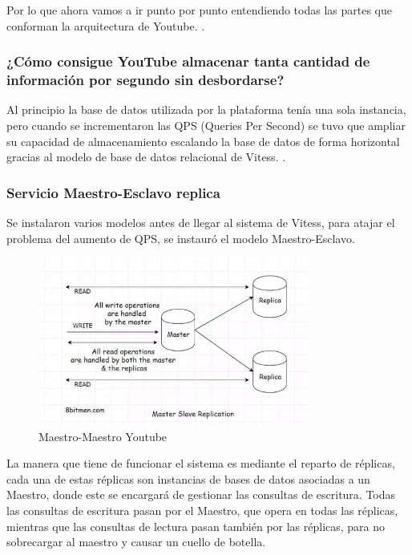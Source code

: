 \documentclass[12pt,a4paper]{article}
\begin{document}
    Por lo que ahora vamos a ir punto por punto entendiendo todas las partes que conforman la arquitectura de Youtube. \cite{gfg2023}.
 
    \subsubsection{¿Cómo consigue YouTube almacenar tanta cantidad de información por segundo sin desbordarse?}

    Al principio la base de datos utilizada por la plataforma tenía una sola instancia, pero cuando se incrementaron las QPS (Queries Per Second) se tuvo que ampliar su capacidad de almacenamiento escalando la base de datos de forma horizontal gracias al modelo de base de datos relacional de Vitess. \cite{morrison2022}.

    \subsubsection{Servicio Maestro-Esclavo replica}

    Se instalaron varios modelos antes de llegar al sistema de Vitess, para atajar el problema del aumento de QPS, se instauró el modelo Maestro-Esclavo.

    \begin{figure}[H]
        \centering
        \includegraphics[width=0.8\textwidth]{./img/maestro-maestro_youtube.png}
        \caption{Maestro-Maestro Youtube}
        \label{fig:maestro_maestro_youtube}
    \end{figure}

    La manera que tiene de funcionar el sistema es mediante el reparto de réplicas, cada una de estas réplicas son instancias de bases de datos asociadas a un Maestro, donde este se encargará de gestionar las consultas de escritura. Todas las consultas de escritura pasan por el Maestro, que opera en todas las réplicas, mientras que las consultas de lectura pasan también por las réplicas, para no sobrecargar al maestro y causar un cuello de botella.
\end{document}
